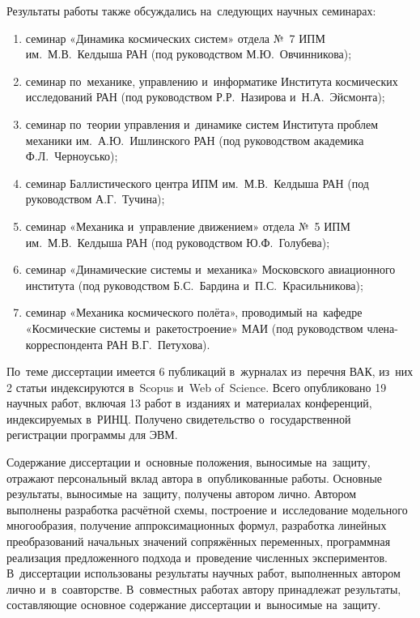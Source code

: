Результаты работы также обсуждались на~следующих научных семинарах:

\begin{enumerate}
    \item семинар «Динамика космических систем» отдела №~7 ИПМ им.~М.В.~Келдыша РАН
    (под руководством М.Ю.~Овчинникова);

    \item семинар по~механике, управлению и~информатике Института космических исследований РАН
    (под руководством Р.Р.~Назирова и~Н.А.~Эйсмонта);

    \item семинар по~теории управления и~динамике систем Института проблем механики им.~А.Ю.~Ишлинского РАН
    (под руководством академика Ф.Л.~Черноусько);

    \item семинар Баллистического центра ИПМ им.~М.В.~Келдыша РАН
    (под руководством А.Г.~Тучина);

    \item семинар «Механика и~управление движением» отдела №~5 ИПМ им.~М.В.~Келдыша РАН
    (под руководством Ю.Ф.~Голубева);

    \item семинар «Динамические системы и~механика» Московского авиационного института
    (под руководством Б.С.~Бардина и~П.С.~Красильникова);

    \item семинар «Механика космического полёта», проводимый на~кафедре «Космические системы и~ракетостроение» МАИ
    (под руководством члена-корреспондента РАН В.Г.~Петухова).
\end{enumerate}

По~теме диссертации имеется 6 публикаций в~журналах из~перечня ВАК, из~них 2 статьи индексируются в~Scopus и~Web of~Science. Всего опубликовано 19 научных работ, включая 13 работ в~изданиях и~материалах конференций, индексируемых в~РИНЦ. Получено свидетельство о~государственной регистрации программы для ЭВМ.


Содержание диссертации и~основные положения, выносимые на~защиту, отражают персональный вклад автора в~опубликованные работы. Основные результаты, выносимые на~защиту, получены автором лично. Автором выполнены разработка расчётной схемы, построение и~исследование модельного многообразия, получение аппроксимационных формул, разработка линейных преобразований начальных значений сопряжённых переменных, программная реализация предложенного подхода и~проведение численных экспериментов. В~диссертации использованы результаты научных работ, выполненных автором лично и~в~соавторстве. В~совместных работах автору принадлежат результаты, составляющие основное содержание диссертации и~выносимые на~защиту.

